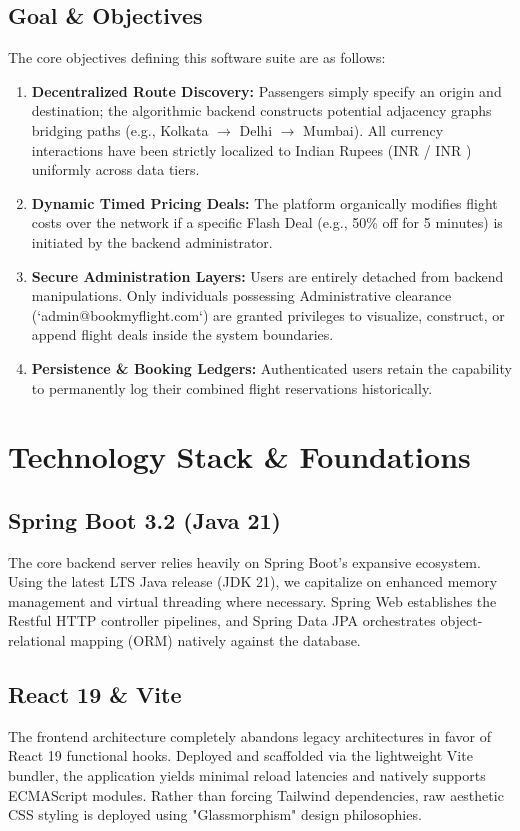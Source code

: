 \documentclass[12pt,a4paper]{article}
\begin{document}
\subsection{Goal \& Objectives}
The core objectives defining this software suite are as follows:
\begin{enumerate}
    \item \textbf{Decentralized Route Discovery:} Passengers simply specify an origin and destination; the algorithmic backend constructs potential adjacency graphs bridging paths (e.g., Kolkata $\rightarrow$ Delhi $\rightarrow$ Mumbai). All currency interactions have been strictly localized to Indian Rupees (INR / INR ) uniformly across data tiers.
    \item \textbf{Dynamic Timed Pricing Deals:} The platform organically modifies flight costs over the network if a specific Flash Deal (e.g., 50\% off for 5 minutes) is initiated by the backend administrator. 
    \item \textbf{Secure Administration Layers:} Users are entirely detached from backend manipulations. Only individuals possessing Administrative clearance (`admin@bookmyflight.com`) are granted privileges to visualize, construct, or append flight deals inside the system boundaries.
    \item \textbf{Persistence \& Booking Ledgers:} Authenticated users retain the capability to permanently log their combined flight reservations historically. 
\end{enumerate}

\newpage

\section{Technology Stack \& Foundations}

\subsection{Spring Boot 3.2 (Java 21)}
The core backend server relies heavily on Spring Boot's expansive ecosystem. Using the latest LTS Java release (JDK 21), we capitalize on enhanced memory management and virtual threading where necessary. Spring Web establishes the Restful HTTP controller pipelines, and Spring Data JPA orchestrates object-relational mapping (ORM) natively against the database. 

\subsection{React 19 \& Vite}
The frontend architecture completely abandons legacy architectures in favor of React 19 functional hooks. Deployed and scaffolded via the lightweight Vite bundler, the application yields minimal reload latencies and natively supports ECMAScript modules. Rather than forcing Tailwind dependencies, raw aesthetic CSS styling is deployed using "Glassmorphism" design philosophies.
\end{document}
